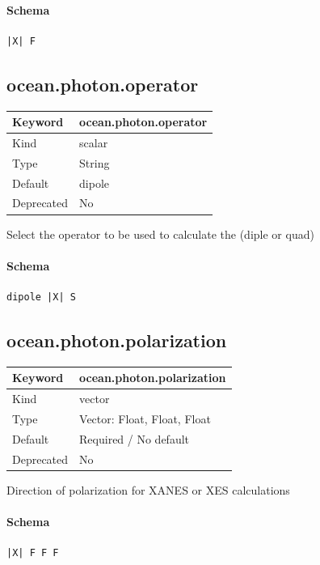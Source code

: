 \documentclass[11pt]{article}
\begin{document}
{{{{{\paragraph{Schema}
\begin{Verbatim}
|X| F
\end{Verbatim}

\subsection{ocean.photon.operator}
\label{kw:ocean-photon-operator}
\begin{longtable}{|p{1.5in}|p{4.5in}|}
\hline
Keyword & ocean.photon.operator \\
\hline
Kind & scalar \\
\hline
Type & String \\
\hline
Default & dipole \\
\hline
Deprecated & No \\
\hline
\end{longtable}
 Select the operator to be used to calculate the (diple or quad)

\paragraph{Schema}
\begin{Verbatim}
dipole |X| S
\end{Verbatim}

\subsection{ocean.photon.polarization}
\label{kw:ocean-photon-polarization}
\begin{longtable}{|p{1.5in}|p{4.5in}|}
\hline
Keyword & ocean.photon.polarization \\
\hline
Kind & vector \\
\hline
Type & Vector: Float, Float, Float \\
\hline
Default & Required / No default \\
\hline
Deprecated & No \\
\hline
\end{longtable}
 Direction of polarization for XANES or XES calculations

\paragraph{Schema}
\begin{Verbatim}
|X| F F F
\end{Verbatim}

}}}}}
\end{document}
